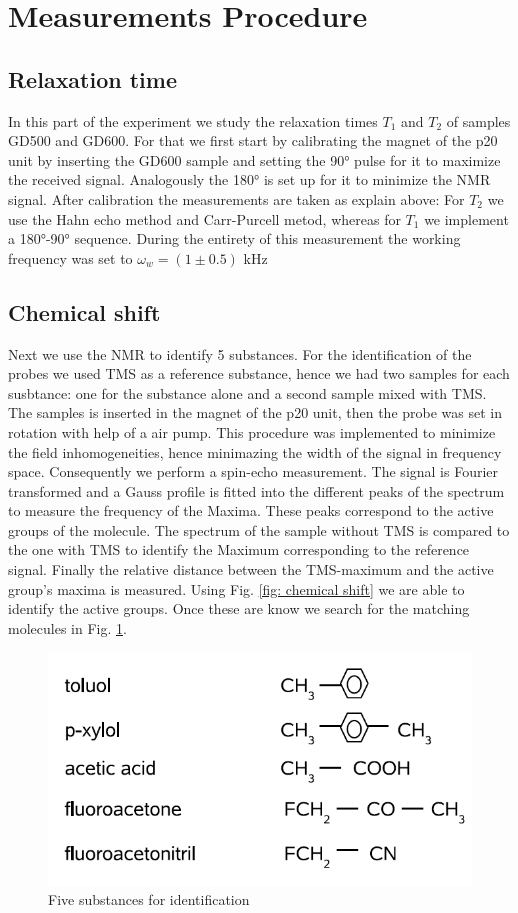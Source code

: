 \section{Measurements Procedure}
\subsection{Relaxation time}
In this part of the experiment we study the relaxation times $T_1$ and $T_2$ of samples GD500 and GD600. For that we first start by calibrating the magnet of the p20 unit by inserting the GD600 sample and setting the 90° pulse for it to maximize the received signal. Analogously the 180° is set up for it to minimize the NMR signal. 
After calibration the measurements are taken as explain above: For $T_2$ we use the Hahn echo method and Carr-Purcell metod, whereas for $T_1$ we implement a 180°-90° sequence. 
During the entirety of this measurement the working frequency was set to $\omega_w = (1 \pm 0.5)$ kHz
\subsection{Chemical shift}
\label{sec: chemical shift}
Next we use the NMR to identify 5 substances. For the identification of the probes we used TMS as a reference substance, hence we had two samples for each susbtance: one for the substance alone and a second sample mixed with TMS.
The samples is inserted in the magnet of the p20 unit, then the probe was set in rotation with help of a air pump. This procedure was implemented to minimize the field inhomogeneities, hence minimazing the width of the signal in frequency space. Consequently we perform a spin-echo measurement. The signal is Fourier transformed and a Gauss profile is fitted into the different peaks of the spectrum to measure the frequency of the Maxima. These peaks correspond to the active groups of the molecule.
The spectrum of the sample without TMS is compared to the one with TMS to identify the Maximum corresponding to the reference signal. Finally the relative distance between the TMS-maximum and the active group's maxima is measured. Using Fig. \ref{fig: chemical shift} we are able to identify the active groups. Once these are know we search for the matching molecules in Fig. \ref{fig: identification}.
\begin{figure}[!htbp]
 \begin{center}
  \includegraphics[width = .6\textwidth]{Latex images/molecules.png}
  \caption[]{Five substances for identification \footnotemark}
    \label{fig: identification}
 \end{center}
\end{figure}
